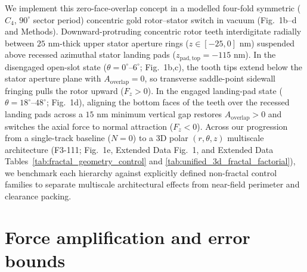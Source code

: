 \documentclass[11pt, a4paper]{article}
\begin{document}
We implement this zero-face-overlap concept in a modelled four-fold symmetric ($C_4$, $90^\circ$ sector period) concentric gold rotor--stator switch in vacuum (Fig.~1b--d and Methods). Downward-protruding concentric rotor teeth interdigitate radially between $25\text{ nm}$-thick upper stator aperture rings ($z \in [-25, 0]\text{ nm}$) suspended above recessed azimuthal stator landing pads ($z_{\mathrm{pad,top}} = -115\text{ nm}$). In the disengaged open-slot state ($\theta = 0^\circ\text{--}6^\circ$; Fig.~1b,c), the tooth tips extend below the stator aperture plane with $A_{\mathrm{overlap}} = 0$, so transverse saddle-point sidewall fringing pulls the rotor upward ($F_z > 0$). In the engaged landing-pad state ($\theta = 18^\circ\text{--}48^\circ$; Fig.~1d), aligning the bottom faces of the teeth over the recessed landing pads across a $15\text{ nm}$ minimum vertical gap restores $A_{\mathrm{overlap}} > 0$ and switches the axial force to normal attraction ($F_z < 0$). Across our progression from a single-track baseline ($N=0$) to a 3D polar $(r,\theta,z)$ multiscale architecture (F3-111; Fig.~1e, Extended Data Fig.~1, and Extended Data Tables~\ref{tab:fractal_geometry_control} and \ref{tab:unified_3d_fractal_factorial}), we benchmark each hierarchy against explicitly defined non-fractal control families to separate multiscale architectural effects from near-field perimeter and clearance packing.

\section*{Force amplification and error bounds}
\end{document}
